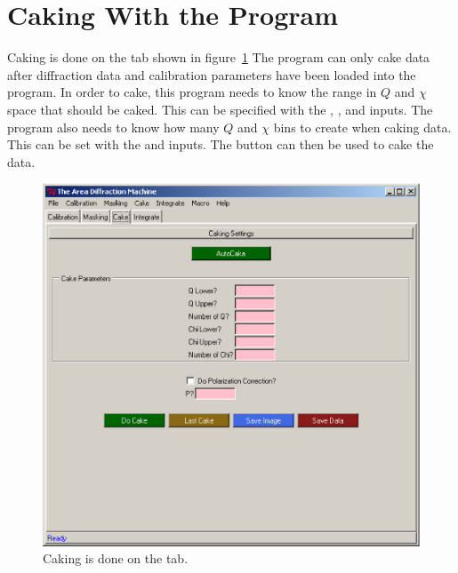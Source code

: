 \section{Caking With the Program}

Caking is done on the  tab shown in figure~\ref{caking_tab}
The program can only cake data after diffraction data and calibration
parameters have been loaded into the program.
In order to cake, this program needs to know the range
in $Q$ and $\chi$ space that should be caked. 
This can be specified with the , 
, and  inputs.
The program also needs to know how many $Q$ and $\chi$ bins to 
create when caking data. This can be set
with the  and  inputs.
The  button can then be used to cake the data. 

\begin{figure}
    \centering
    \includegraphics[scale=.75]{figures/caking_tab.eps}
    \caption{Caking is done on the  tab.} 
    \label{caking_tab}
\end{figure}

